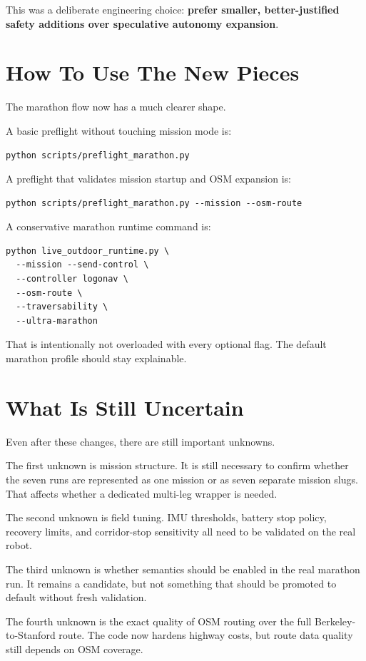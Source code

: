 \documentclass[11pt]{article}
\begin{document}
This was a deliberate engineering choice: \textbf{prefer smaller, better-justified safety additions over speculative autonomy expansion}.

\section{How To Use The New Pieces}
The marathon flow now has a much clearer shape.

A basic preflight without touching mission mode is:
\begin{verbatim}
python scripts/preflight_marathon.py
\end{verbatim}

A preflight that validates mission startup and OSM expansion is:
\begin{verbatim}
python scripts/preflight_marathon.py --mission --osm-route
\end{verbatim}

A conservative marathon runtime command is:
\begin{verbatim}
python live_outdoor_runtime.py \
  --mission --send-control \
  --controller logonav \
  --osm-route \
  --traversability \
  --ultra-marathon
\end{verbatim}

That is intentionally not overloaded with every optional flag. The default marathon profile should stay explainable.

\section{What Is Still Uncertain}
Even after these changes, there are still important unknowns.

The first unknown is mission structure. It is still necessary to confirm whether the seven runs are represented as one mission or as seven separate mission slugs. That affects whether a dedicated multi-leg wrapper is needed.

The second unknown is field tuning. IMU thresholds, battery stop policy, recovery limits, and corridor-stop sensitivity all need to be validated on the real robot.

The third unknown is whether semantics should be enabled in the real marathon run. It remains a candidate, but not something that should be promoted to default without fresh validation.

The fourth unknown is the exact quality of OSM routing over the full Berkeley-to-Stanford route. The code now hardens highway costs, but route data quality still depends on OSM coverage.
\end{document}
